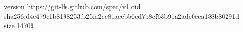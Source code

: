 version https://git-lfs.github.com/spec/v1
oid sha256:d4c479c1b8198253fb25fa2cc81aeebb6cd7b8cf63b91a2ade0eea188b80291d
size 14709
